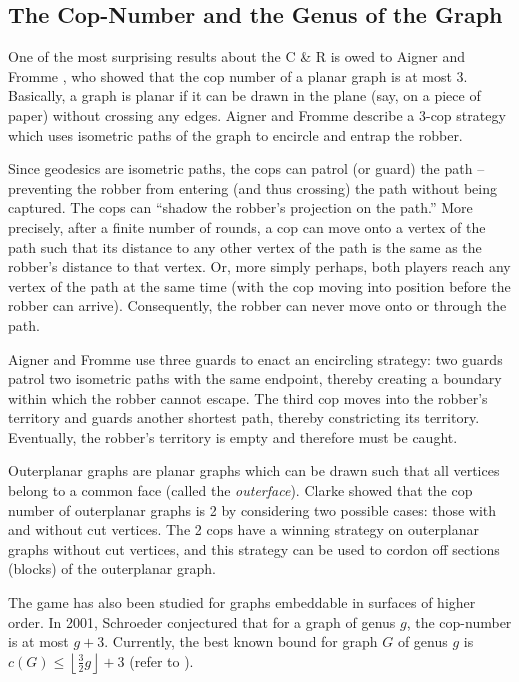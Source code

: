 \subsection{The Cop-Number and the Genus of the Graph}\label{intro cops and genus}

One of the most surprising results about the C \& R is owed to Aigner and Fromme \cite{aigner1984game}, who showed that the cop number of a planar graph is at most 3.
Basically, a graph is planar if it can be drawn in the plane (say, on a piece of paper) without crossing any edges. Aigner and Fromme describe a 3-cop strategy which uses isometric paths of the graph to encircle and entrap the robber.

Since geodesics are isometric paths, the cops can patrol (or guard) the path -- preventing the robber from entering (and thus crossing) the path without being captured. The cops can ``shadow the robber's projection on the path.'' More precisely, after a finite number of rounds, a cop can move onto a vertex of the path such that its distance to any other vertex of the path is the same as the robber's distance to that vertex. Or, more simply perhaps, both players reach any vertex of the path at the same time (with the cop moving into position before the robber can arrive). Consequently, the robber can never move onto or through the path.

Aigner and Fromme use three guards to enact an encircling strategy: two guards patrol two isometric paths with the same endpoint, thereby creating a boundary within which the robber cannot escape. The third cop moves into the robber's territory and guards another shortest path, thereby constricting its territory. Eventually, the robber's territory is empty and therefore must be caught.

Outerplanar graphs are planar graphs which can be drawn such that all vertices belong to a common face
(called the \textit{outerface}). Clarke \cite{clarke2002constrained} showed that the cop number of outerplanar graphs is 2 by considering
two possible cases: those with and without cut vertices. The 2 cops have a winning strategy on outerplanar graphs without cut vertices, and this strategy can be used to cordon off sections (blocks)
of the outerplanar graph.

The game has also been studied for graphs embeddable in surfaces of higher order.
In 2001, Schroeder conjectured \cite{bonato2017topological} that for a graph of genus $g$,
the cop-number is at most $g+3$. Currently, the best known bound for graph $G$ of genus $g$ is $c(G) \leq \left\lfloor \frac{3}{2}g \right\rfloor +3$ (refer to \cite{schroder2001copnumber}).

